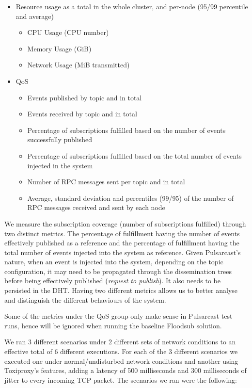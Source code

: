 \begin{itemize}
  \item Resource usage as a total in the whole cluster, and per-node (95/99
  percentile and average)
  \begin{itemize}
    \item CPU Usage (CPU number)
    \item Memory Usage (GiB)
    \item Network Usage (MiB transmitted)
  \end{itemize}
  \item QoS
  \begin{itemize}
    \item Events published by topic and in total
    \item Events received by topic and in total
    \item Percentage of subscriptions fulfilled based on the number of events
    successfully published
    \item Percentage of subscriptions fulfilled based on the total number of events
    injected in the system
    \item Number of RPC messages sent per topic and in total
    \item Average, standard deviation and percentiles (99/95) of the number of RPC messages received and sent by each node
  \end{itemize}
\end{itemize}

We measure the subscription coverage (number of subscriptions fulfilled)
through two distinct metrics. The percentage of fulfillment having the number
of events effectively published as a reference and the percentage of
fulfillment having the total number of events injected into the system as
reference. Given Pulsarcast's nature, when an event is injected into the
system, depending on the topic configuration, it may need to be propagated
through the dissemination trees before being effectively published
(\emph{request to publish}). It also needs to be persisted in the DHT. Having
two different metrics allows us to better analyse and distinguish the different
behaviours of the system.

Some of the metrics under the QoS group only make sense in Pulsarcast test
runs, hence will be ignored when running the baseline Floodsub solution.

We ran 3 different scenarios under 2 different sets of network conditions to an
effective total of 6 different executions. For each of the 3 different
scenarios we executed one under normal/undisturbed network conditions and
another using Toxiproxy's features, adding a latency of 500 milliseconds and
300 milliseconds of jitter to every incoming TCP packet. The scenarios we ran
were the following:


